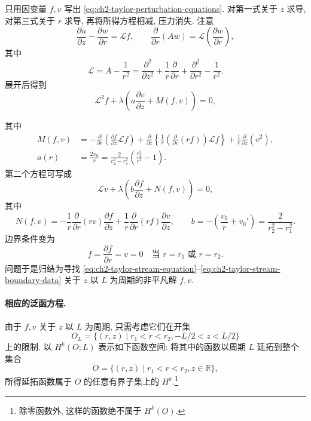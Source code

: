 只用因变量 $f,v$ 写出 \eqref{eq:ch2-taylor-perturbation-equations}. 对第一式关于 $z$ 求导, 对第三式关于 $r$ 求导, 再将所得方程相减, 压力消失. 注意
\[
\frac{\partial u}{\partial z}-\frac{\partial w}{\partial r}=\mathcal Lf,
\qquad
\frac\partial{\partial r}(Aw)=\mathcal L\left(\frac{\partial w}{\partial r}\right),
\]
其中
\[
\mathcal L=A-\frac1{r^2}
=\frac{\partial^2}{\partial z^2}+\frac1r\frac\partial{\partial r}
+\frac{\partial^2}{\partial r^2}-\frac1{r^2}.
\]
展开后得到
\begin{equation}
\mathcal L^2f+\lambda\left(a\frac{\partial v}{\partial z}+M(f,v)\right)=0,
\label{eq:ch2-taylor-stream-equation}
\end{equation}

\hypertarget{chapter-02-page-168}{}
其中
\[
\begin{aligned}
M(f,v)
&=-\frac\partial{\partial r}\left(\frac{\partial f}{\partial z}\mathcal Lf\right)
+\frac\partial{\partial z}\left\{\frac1r\left(\frac\partial{\partial r}(rf)\right)\mathcal Lf\right\}
+\frac1r\frac\partial{\partial z}(v^2),\\
a(r)&=\frac{2v_0}{r}
=\frac2{r_2^2-r_1^2}\left(\frac{r_2^2}{r^2}-1\right).
\end{aligned}
\]
第二个方程可写成
\begin{equation}
\mathcal Lv+\lambda\left(b\frac{\partial f}{\partial z}+N(f,v)\right)=0,
\label{eq:ch2-taylor-azimuthal-equation}
\end{equation}
其中
\[
N(f,v)=-\frac1r\frac\partial{\partial r}(rv)\frac{\partial f}{\partial z}
+\frac1r\frac\partial{\partial r}(rf)\frac{\partial v}{\partial z},
\qquad
b=-\left(\frac{v_0}{r}+v_0'\right)=\frac2{r_2^2-r_1^2}.
\]
边界条件变为
\begin{equation}
f=\frac{\partial f}{\partial r}=v=0
\quad\text{当 }r=r_1\text{ 或 }r=r_2.
\label{eq:ch2-taylor-stream-boundary-data}
\end{equation}
问题于是归结为寻找 \eqref{eq:ch2-taylor-stream-equation}--\eqref{eq:ch2-taylor-stream-boundary-data} 关于 $z$ 以 $L$ 为周期的非平凡解 $f,v$.

\paragraph{相应的泛函方程.}
\label{subsec:ch2-taylor-functional-equation}
由于 $f,v$ 关于 $z$ 以 $L$ 为周期, 只需考虑它们在开集
\[
O_L=\{(r,z)\mid r_1<r<r_2,-L/2<z<L/2\}
\]
上的限制. 以 $H^k(O;L)$ 表示如下函数空间: 将其中的函数以周期 $L$ 延拓到整个集合
\[
O=\{(r,z)\mid r_1<r<r_2,z\in\mathbb R\},
\]
所得延拓函数属于 $O$ 的任意有界子集上的 $H^k$.\footnote{除零函数外, 这样的函数绝不属于 $H^k(O)$.}

